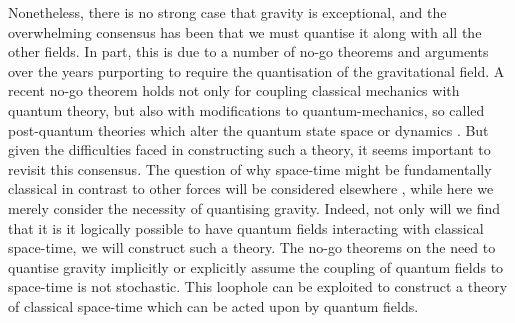 \documentclass[aps,pra,showpacs,citeautoscript,amsmath,amssymb,floatfix,superscriptaddress,bbm, verbatim,amsfonts,changes,11pt,nofootinbib,longbibliography]{revtex4-2}
\begin{document}
Nonetheless, there is no strong case that gravity is exceptional, and the overwhelming consensus has been that we must quantise it along with all the other fields. In part, this is due to 
a number of no-go theorems and arguments over the years \cite{bohr1933on,cecile2011role,dewitt1962definition,
eppley1977necessity,caro1999impediments,salcedo1996absence,
sahoo2004mixing,terno2006inconsistency,salcedo2012statistical,barcelo2012hybrid,marletto2017we} purporting to require the quantisation of the gravitational field.
A recent no-go theorem \cite{marletto2017we} holds not only for coupling classical mechanics with quantum theory, but also with modifications to quantum-mechanics, so called post-quantum theories which alter the quantum state space or dynamics \cite{dynamics_foot}.
But given the difficulties faced in constructing such a theory, it seems important to revisit this consensus. The question of why space-time might be fundamentally classical in contrast to other forces will be considered elsewhere \cite{oppenheim2023rethink}, while here we merely consider the necessity of quantising gravity. Indeed, not only will we find that it is it logically possible to have quantum fields interacting with classical space-time, we will construct such a theory. The no-go theorems on the need to quantise gravity implicitly or explicitly assume the coupling of quantum fields to space-time is not stochastic. This loophole can be exploited to construct a theory of classical space-time which can be acted upon by quantum fields.
\end{document}
